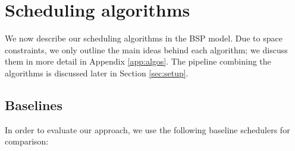 \documentclass[sigconf,nonacm]{acmart}
\begin{document}
\section{Scheduling algorithms}

We now describe our scheduling algorithms in the BSP model. Due to space constraints, we only outline the main ideas behind each algorithm; we discuss them in more detail in Appendix \ref{app:algos}. The pipeline combining the algorithms is discussed later in Section \ref{sec:setup}.

\subsection{Baselines}

In order to evaluate our approach, we use the following baseline schedulers for comparison:
\end{document}
